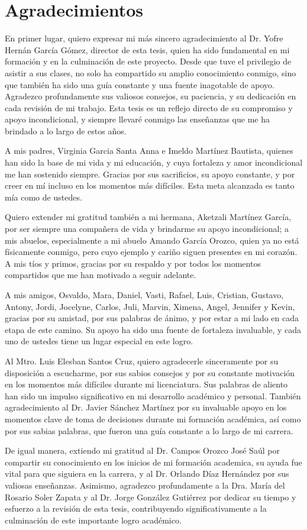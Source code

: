\chapter*{Agradecimientos}
En primer lugar, quiero expresar mi más sincero agradecimiento al Dr. Yofre Hernán García Gómez, director de esta tesis, quien ha sido fundamental en mi formación y en la culminación de este proyecto. Desde que tuve el privilegio de asistir a sus clases, no solo ha compartido su amplio conocimiento conmigo, sino que también ha sido una guía constante y una fuente inagotable de apoyo. Agradezco profundamente sus valiosos consejos, su paciencia, y su dedicación en cada revisión de mi trabajo. Esta tesis es un reflejo directo de su compromiso y apoyo incondicional, y siempre llevaré conmigo las enseñanzas que me ha brindado a lo largo de estos años.

A mis padres, Virginia Garcia Santa Anna e Imeldo Martínez Bautista, quienes han sido la base de mi vida y mi educación, y cuya fortaleza y amor incondicional me han sostenido siempre. Gracias por sus sacrificios, su apoyo constante, y por creer en mí incluso en los momentos más difíciles. Esta meta alcanzada es tanto mía como de ustedes.

Quiero extender mi gratitud también a mi hermana, Aketzali Martínez García, por ser siempre una compañera de vida y brindarme su apoyo incondicional; a mis abuelos, especialmente a mi abuelo Amando García Orozco, quien ya no está físicamente conmigo, pero cuyo ejemplo y cariño siguen presentes en mi corazón. A mis tíos y primos, gracias por su respaldo y por todos los momentos compartidos que me han motivado a seguir adelante.

A mis amigos, Osvaldo, Mara, Daniel, Vasti, Rafael, Luis, Cristian, Gustavo, Antony, Jordi, Jocelyne, Carlos, Juli, Marvin, Ximena, Angel, Jennifer y Kevin, gracias por su amistad, por sus palabras de ánimo, y por estar a mi lado en cada etapa de este camino. Su apoyo ha sido una fuente de fortaleza invaluable, y cada uno de ustedes tiene un lugar especial en este logro. 

Al Mtro. Luis Elesban Santos Cruz, quiero agradecerle sinceramente por su disposición a escucharme, por sus sabios consejos y por su constante motivación en los momentos más difíciles durante mi licenciatura. Sus palabras de aliento han sido un impulso significativo en mi desarrollo académico y personal. También agradecimiento al Dr. Javier Sánchez Martínez por su invaluable apoyo en los momentos clave de toma de decisiones durante mi formación académica, así como por sus sabias palabras, que fueron una guía constante a lo largo de mi carrera.


De igual manera, extiendo mi gratitud al Dr. Campos Orozco José Saúl por compartir su conocimiento en los inicios de mi formación academica, su ayuda fue vital para que siguiera en la carrera, y al Dr. Orlando Díaz Hernández por sus valiosas enseñanzas. Asimismo, agradezco profundamente a la Dra. María del Rosario Soler Zapata y al Dr. Jorge González Gutiérrez por dedicar su tiempo y esfuerzo a la revisión de esta tesis, contribuyendo significativamente a la culminación de este importante logro académico.
